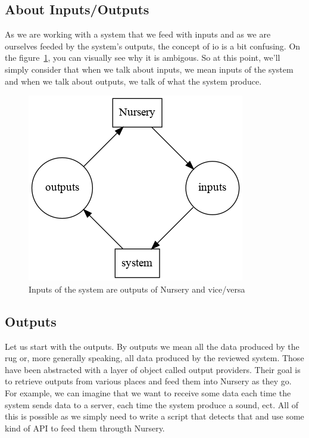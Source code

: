\documentclass[12pt]{article}
\begin{document}
\subsection{About Inputs/Outputs}

As we are working with a system that we feed with inputs and as we are ourselves feeded by the system's outputs, the concept of \gls{io} is a bit confusing. On the figure~\ref{io_abstract}, you can visually see why it is ambigous. So at this point, we'll simply consider that when we talk about inputs, we mean inputs of the system and when we talk about outputs, we talk of what the system produce.\\

\begin{figure}
    \centering
    \includegraphics[scale=0.6]{io_abstract.png}
    \caption{Inputs of the system are outputs of Nursery and vice/versa}
    \label{io_abstract}
\end{figure}

\subsection{Outputs}

Let us start with the outputs. By outputs we mean all the data produced by the \gls{rug} or, more generally speaking, all data produced by the reviewed system. Those have been abstracted with a layer of object called output providers. Their goal is to retrieve outputs from various places and feed them into Nursery as they go.\\

For example, we can imagine that we want to receive some data each time the system sends data to a server, each time the system produce a sound, ect. All of this is possible as we simply need to write a script that detects that and use some kind of API to feed them througth Nursery.\\
\end{document}

